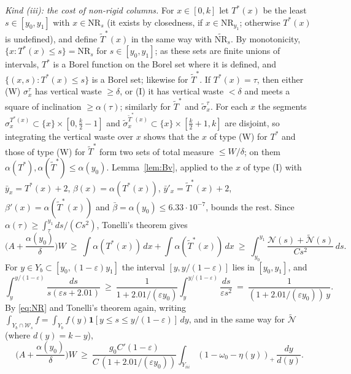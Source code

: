 \documentclass[11pt]{amsart}
\theoremstyle{definition}
\theoremstyle{remark}
\begin{document}
\smallskip\noindent\emph{Kind (iii): the cost of non-rigid columns.}
For $x\in[0,k]$ let $T^*(x)$ be the least $s\in[y_0,y_1]$ with $x\in\mathrm{NR}_s$ (it exists by closedness, if
$x\in\mathrm{NR}_{y_1}$; otherwise $T^*(x)$ is undefined), and define $\widetilde T^*(x)$ in the same way with $\widetilde{\mathrm{NR}}_s$.
By monotonicity, $\{x:T^*(x)\le s\}=\mathrm{NR}_s$ for $s\in[y_0,y_1]$; as these sets are finite unions of intervals, $T^*$ is a Borel
function on the Borel set where it is defined, and $\{(x,s):T^*(x)\le s\}$ is a Borel set; likewise for $\widetilde T^*$.
If $T^*(x)=\tau$, then either (W) $\sigma^\tau_x$ has vertical waste $\ge\delta$, or (I) it has vertical waste $<\delta$ and meets a
square of inclination $\ge\alpha(\tau)$; similarly for $\widetilde T^*$ and $\tilde\sigma^\tau_x$. For each $x$ the segments
$\sigma^{T^*(x)}_x\subset\{x\}\times[0,\frac k2-1]$ and $\tilde\sigma^{\widetilde T^*(x)}_x\subset\{x\}\times[\frac k2+1,k]$ are disjoint, so
integrating the vertical waste over $x$ shows that the $x$ of type (W) for $T^*$ and those of type (W) for $\widetilde T^*$
form two sets of total measure $\le W/\delta$; on them $\alpha(T^*),\alpha(\widetilde T^*)\le\alpha(y_0)$. Lemma~\ref{lem:Bv}, applied to the
$x$ of type (I) with $\bar y_x=T^*(x)+2$, $\beta(x)=\alpha(T^*(x))$, $\bar y'_x=\widetilde T^*(x)+2$, $\beta'(x)=\alpha(\widetilde T^*(x))$ and
$\bar\beta=\alpha(y_0)\le6.33\cdot10^{-7}$, bounds the rest. Since $\alpha(\tau)\ge\int_\tau^{y_1}ds/(Cs^2)$, Tonelli's theorem gives
\[
\Big(A+\frac{\alpha(y_0)}\delta\Big)W\ \ge\ \int\alpha(T^*(x))\,dx+\int\alpha(\widetilde T^*(x))\,dx\ \ge\ \int_{y_0}^{y_1}\frac{\mathcal N(s)+\widetilde{\mathcal N}(s)}{Cs^2}\,ds .
\]
For $y\in Y_b\subset[y_0,(1-\varepsilon)y_1]$ the interval $[y,y/(1-\varepsilon)]$ lies in $[y_0,y_1]$, and
\[
\int_y^{y/(1-\varepsilon)}\frac{ds}{s(\varepsilon s+2.01)}\ \ge\ \frac1{1+2.01/(\varepsilon y_0)}\int_y^{y/(1-\varepsilon)}\frac{ds}{\varepsilon s^2}
\ =\ \frac1{(1+2.01/(\varepsilon y_0))\,y} .
\]
By \eqref{eq:NR} and Tonelli's theorem again, writing $\int_{Y_b\cap\mathcal W_s}f=\int_{Y_b}f(y)\mathbf 1[y\le s\le y/(1-\varepsilon)]\,dy$, and in
the same way for $\widetilde{\mathcal N}$ (where $d(y)=k-y$),
\[
\Big(A+\frac{\alpha(y_0)}\delta\Big)W\ \ge\ \frac{g_0C'(1-\varepsilon)}{C\,(1+2.01/(\varepsilon y_0))}\int_{Y_{iii}}(1-\omega_0-\eta(y))_+\,\frac{dy}{d(y)} .
\]
\end{document}
